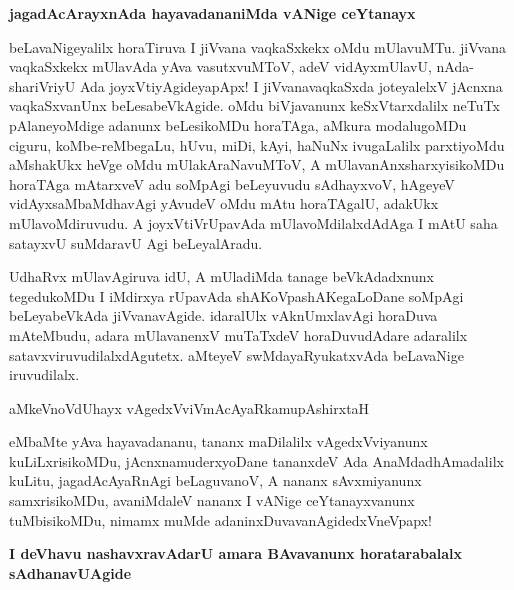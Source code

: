 {\bigskip
\noindent
{\large\bf jagadAcArayxnAda hayavadananiMda vANige ceYtanayx}}\label{page128}
\medskip

\noindent
beLavaNigeyalilx horaTiruva I jiVvana vaqkaSxkekx oMdu mUlavuMTu. jiVvana vaqkaSxkekx mUla\-vAda yAva vasutxvuMToV, adeV vidAyxmUlavU, nAda-shariV\break\-riyU Ada joyxVtiyAgideyapApx! I jiVva\-navaqkaSxda joteyalelxV jAcnxna vaqkaSx\-vanUnx beLesabeVkAgide. oMdu biVjavanunx keSxVtarxdalilx neTuTx pAlaneyoM\-dige \hbox{adanunx} beLesikoMDu horaTAga, aMkura modalugoMDu ciguru, koMbe-reMbegaLu, hUvu, miDi, kAyi, haNuNx ivugaLalilx parxtiyoMdu aMshakUkx heVge oMdu mUlakAraNavuMToV, A mUlava\-nAnx\-sharxyisikoMDu horaTAga mAtarxveV adu soMpAgi beLeyuvudu sAdhayxvoV, hAgeyeV vidAyx\-saMbaMdhavAgi yAvudeV oMdu mAtu horaTAgalU, adakUkx mUlavoMdiruvudu. A joyxVtiV\-rUpa\-vAda mUlavoMdilalxdAdAga I mAtU saha satayxvU suMdaravU Agi beLeyalAradu.

\medskip
UdhaRvx mUlavAgiruva idU, A mUladiMda tanage beVkAdadxnunx tegedu\-koMDu I iMdirxya rUpavAda shAKoVpashAKegaLoDane soMpAgi beLeya\-beVkAda jiVvanavAgide. idaralUlx vAknUmxla\-vAgi horaDuva mAteMbudu, adara mUlavanenxV muTaTxdeV horaDuvudAdare adaralilx satavxviruvu\-dilalx\-dAgutetx. aMteyeV swMdayaRyukatxvAda beLavaNige iruvudilalx.

\begin{shloka}
aMkeVnoVdUhayx vAgedxVviVmAcAyaRkamupAshirxtaH
\end{shloka}

eMbaMte yAva hayavadananu, tananx maDilalilx vAgedxVviyanunx kuLiLxrisi\-koMDu, jAcnxna\-muderxyo\-Dane tananxdeV Ada AnaMdadhAmadalilx kuLitu, jagadAcAyaRnAgi beLaguvanoV, A nananx sAvxmi\-yanunx samxrisi\-koMDu, avaniMdaleV nananx I vANige ceYtanayxvanunx tuMbisikoMDu, nimamx muMde adaninxDuvava\-nAgidedxVneVpapx!

\newpage
{\bigskip
\noindent
{\large\bf I deVhavu nashavxravAdarU amara BAvavanunx horatarabalalx sAdhanavU\break Agide}}\label{page129}
\medskip

